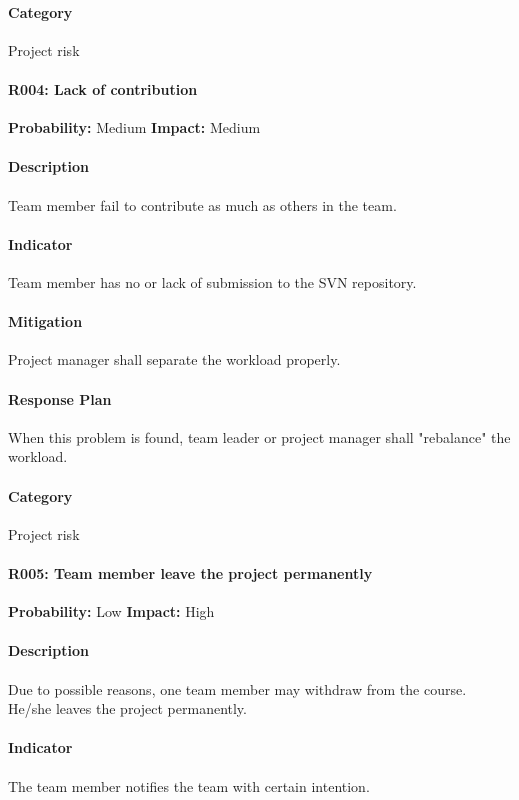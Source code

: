 \documentclass[11pt, a4paper]{report}
\begin{document}
	\paragraph{Category} Project risk
\pagebreak

	\paragraph{R004: Lack of contribution} \hspace{1cm} \textbf{Probability: }Medium\hspace{1cm}   \textbf{Impact: }Medium
	\paragraph{Description}Team member fail to contribute as much as others in the team.
	\paragraph{Indicator}Team member has no or lack of submission to the SVN repository. 
	\paragraph{Mitigation}Project manager shall separate the workload properly.
	\paragraph{Response Plan}When this problem is found, team leader or project manager shall "rebalance" the workload. \\
	\paragraph{Category} Project risk
	
	\paragraph{R005: Team member leave the project permanently} \hspace{1cm} \textbf{Probability: }Low\hspace{1cm}   \textbf{Impact: }High
	\paragraph{Description}Due to possible reasons, one team member may withdraw from the course. He/she leaves the project permanently.
	\paragraph{Indicator}The team member notifies the team with certain intention.
\end{document}
